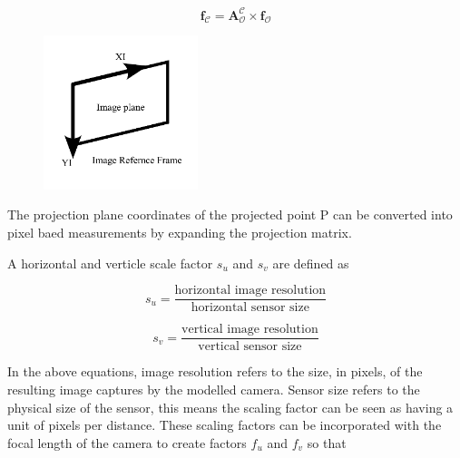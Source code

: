 \begin{equation}
    \mathbf{f}_{\mathcal{C}} = \mathbf{A}_{\mathcal{O}}^{\mathcal{C}}\times\mathbf{f}_{\mathcal{O}}
\end{equation}


\begin{figure}[H]
    \centering
    \includegraphics[width=0.4\textwidth]{figures/modelling/MRF.pdf}
    \caption{}
    \label{fig:MRF}
\end{figure}






The projection plane coordinates of the projected point P can be converted into pixel baed measurements by expanding the projection matrix.

A horizontal and verticle scale factor $s_u$ and $s_v$ are defined as 


\begin{equation}
    s_u = \frac{\text{horizontal image resolution}}{\text{horizontal sensor size}}
\end{equation}

\begin{equation}
    s_v = \frac{\text{vertical image resolution}}{\text{vertical sensor size}}
\end{equation}

In the above equations, image resolution refers to the size, in pixels, of the resulting image captures by the modelled camera. Sensor size refers to the physical
size of the sensor, this means the scaling factor can be seen as having a unit of pixels per distance. These scaling factors can be incorporated with the focal length
of the camera to create factors $f_u$ and $f_v$ so that

